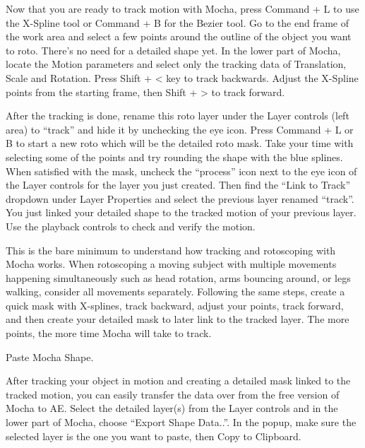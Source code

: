 \begin{fullwidth}

Now that you are ready to track motion with Mocha, press Command + L to use the X-Spline tool or Command + B for the Bezier tool. Go to the end frame of the work area and select a few points around the outline of the object you want to roto. There’s no need for a detailed shape yet. In the lower part of Mocha, locate the Motion parameters and select only the tracking data of Translation, Scale and Rotation. Press Shift + < key to track backwards. Adjust the X-Spline points from the starting frame, then Shift + > to track forward.



After the tracking is done, rename this roto layer under the Layer controls (left area) to “track” and hide it by unchecking the eye icon. Press Command + L or B to start a new roto which will be the detailed roto mask. Take your time with selecting some of the points and try rounding the shape with the blue splines. When satisfied with the mask, uncheck the “process” icon next to the eye icon of the Layer controls for the layer you just created. Then find the “Link to Track” dropdown under Layer Properties and select the previous layer renamed “track”. You just linked your detailed shape to the tracked motion of your previous layer. Use the playback controls to check and verify the motion.
\clearpage
{}

This is the bare minimum to understand how tracking and rotoscoping with Mocha works. When rotoscoping a moving subject with multiple movements happening simultaneously such as head rotation, arms bouncing around, or legs walking, consider all movements separately. Following the same steps, create a quick mask with X-splines, track backward, adjust your points, track forward, and then create your detailed mask to later link to the tracked layer. The more points, the more time Mocha will take to track.


{\large Paste Mocha Shape. \par}

After tracking your object in motion and creating a detailed mask linked to the tracked motion, you can easily transfer the data over from the free version of Mocha to AE. Select the detailed layer(s) from the Layer controls and in the lower part of Mocha, choose “Export Shape Data..”. In the popup, make sure the selected layer is the one you want to paste, then Copy to Clipboard.


\end{fullwidth}
